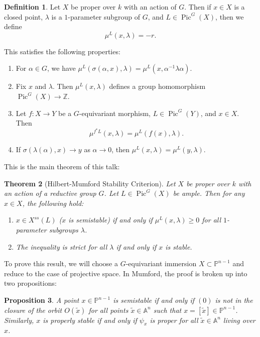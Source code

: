 \documentclass[leqno, openany]{memoir}
\newtheorem{thm}{Theorem}[section]
\newtheorem{prop}[thm]{Proposition}
\theoremstyle{definition}
\newtheorem{defn}[thm]{Definition}
\theoremstyle{remark}
\theoremstyle{plain}
\theoremstyle{definition}
\theoremstyle{remark}
\newcommand{\A}{\mathbb{A}}
\newcommand{\Z}{\mathbb{Z}}
\renewcommand{\P}{\mathbb{P}}
\newcommand{\wt}[1]{\widetilde{#1}}
\DeclareMathOperator{\Pic}{Pic}
\begin{document}
\begin{defn}
    Let $X$ be proper over $k$ with an action of $G$. Then if $x \in X$ is a closed point, $\lambda$ is a $1$-parameter subgroup of $G$, and $L \in \Pic^G(X)$, then we define
    \[ \mu^L(x, \lambda) = -r. \]
\end{defn}

This satisfies the following properties:
\begin{enumerate}
    \item For $\alpha \in G$, we have $\mu^L(\sigma(\alpha,x), \lambda) = \mu^L(x, \alpha^{-1} \lambda \alpha)$.
    \item Fix $x$ and $\lambda$. Then $\mu^L(x, \lambda)$ defines a group homomorphism $\Pic^G(X) \to \Z$.
    \item Let $f \colon X \to Y$ be a $G$-equivariant morphism, $L \in \Pic^G(Y)$, and $x \in X$. Then
        \[ \mu^{f^*L}(x, \lambda) = \mu^L(f(x), \lambda). \]
    \item If $\sigma(\lambda(\alpha), x) \to y$ as $\alpha \to 0$, then $\mu^L(x, \lambda) = \mu^L(y, \lambda)$.
\end{enumerate}

This is the main theorem of this talk:
\begin{thm}[Hilbert-Mumford Stability Criterion]
    Let $X$ be proper over $k$ with an action of a reductive group $G$. Let $L \in \Pic^G(X)$ be ample. Then for any $x \in X$, the following hold:
    \begin{enumerate}
        \item $x \in X^{ss}(L)$ ($x$ is semistable) if and only if $\mu^L(x, \lambda) \geq 0$ for all $1$-parameter subgroups $\lambda$.
        \item The inequality is strict for all $\lambda$ if and only if $x$ is stable.
    \end{enumerate}
\end{thm}

To prove this result, we will choose a $G$-equivariant immersion $X \subset \P^{n-1}$ and reduce to the case of projective space. In Mumford, the proof is broken up into two propositions:

\begin{prop}
    A point $x \in \P^{n-1}$ is semistable if and only if $(0)$ is not in the closure of the orbit $O(\wt{x})$ for all points $\wt{x} \in \A^n$ such that $x = [\wt{x}] \in \P^{n-1}$. Similarly, $x$ is properly stable if and only if $\psi_x$ is proper for all $\wt{x} \in \A^n$ living over $x$.
\end{prop}
\end{document}

